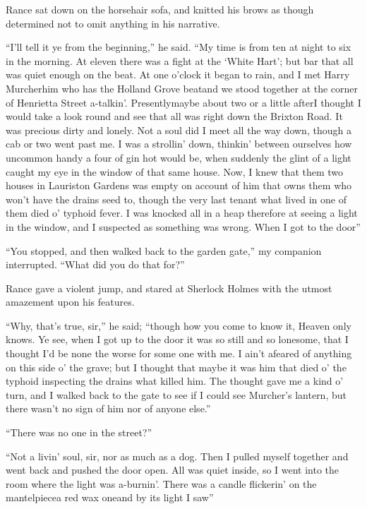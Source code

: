 \documentclass[12pt,english]{book}
\begin{document}
Rance sat down on the horsehair sofa, and knitted his brows as though
determined not to omit anything in his narrative.

{}``I'll tell it ye from the beginning,'' he said. {}``My time
is from ten at night to six in the morning. At eleven there was a
fight at the `White Hart'; but bar that all was quiet enough on the
beat. At one o'clock it began to rain, and I met Harry Murcher\mdsh{---}him
who has the Holland Grove beat\mdsh{---}and we stood together at
the corner of Henrietta Street a-talkin'. Presently\mdsh{---}maybe
about two or a little after\mdsh{---}I thought I would take a look
round and see that all was right down the Brixton Road. It was precious
dirty and lonely. Not a soul did I meet all the way down, though a
cab or two went past me. I was a strollin' down, thinkin' between
ourselves how uncommon handy a four of gin hot would be, when suddenly
the glint of a light caught my eye in the window of that same house.
Now, I knew that them two houses in Lauriston Gardens was empty on
account of him that owns them who won't have the drains seed to, though
the very last tenant what lived in one of them died o' typhoid fever.
I was knocked all in a heap therefore at seeing a light in the window,
and I suspected as something was wrong. When I got to the door\mdsh{---}''

{}``You stopped, and then walked back to the garden gate,'' my companion
interrupted. {}``What did you do that for?''

Rance gave a violent jump, and stared at Sherlock Holmes with the
utmost amazement upon his features.

{}``Why, that's true, sir,'' he said; {}``though how you come to
know it, Heaven only knows. Ye see, when I got up to the door it was
so still and so lonesome, that I thought I'd be none the worse for
some one with me. I ain't afeared of anything on this side o' the
grave; but I thought that maybe it was him that died o' the typhoid
inspecting the drains what killed him. The thought gave me a kind
o' turn, and I walked back to the gate to see if I could see Murcher's
lantern, but there wasn't no sign of him nor of anyone else.''

{}``There was no one in the street?''

{}``Not a livin' soul, sir, nor as much as a dog. Then I pulled myself
together and went back and pushed the door open. All was quiet inside,
so I went into the room where the light was a-burnin'. There was a
candle flickerin' on the mantelpiece\mdsh{---}a red wax one\mdsh{---}and
by its light I saw\mdsh{---}''
\end{document}
